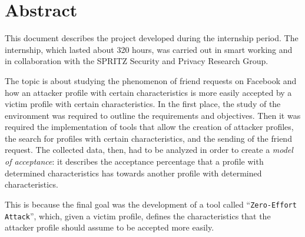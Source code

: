 
\cleardoublepage
{}
{}
\begingroup
\let\clearpage\relax
\let\cleardoublepage\relax
\let\cleardoublepage\relax

\chapter*{Abstract}

This document describes the project developed during the internship period. The internship, which lasted about 320 hours, was carried out in smart working and in collaboration with the SPRITZ Security and Privacy Research Group.\par \noindent 
The topic is about studying the phenomenon of friend requests on Facebook and how an attacker profile with certain characteristics is more easily accepted by a victim profile with certain characteristics. In the first place, the study of the environment was required to outline the requirements and objectives. Then it was required the implementation of tools that allow the creation of attacker profiles, the search for profiles with certain characteristics, and the sending of the friend request. The collected data, then, had to be analyzed in order to create a \textit{model of acceptance}: it describes the acceptance percentage that a profile with determined characteristics has towards another profile with determined characteristics.\par \noindent 
This is because the final goal was the development of a tool called ``\texttt{Zero-Effort Attack}'', which, given a victim profile, defines the characteristics that the attacker profile should assume to be accepted more easily.

%
%

\endgroup			

\vfill

